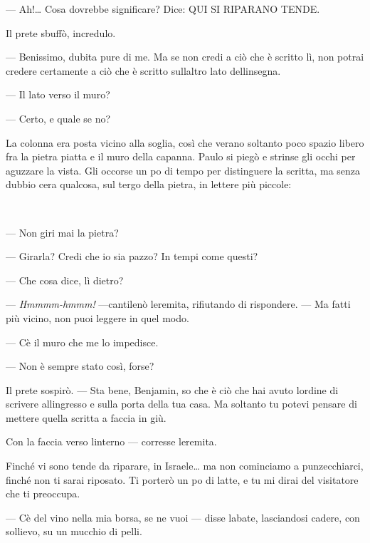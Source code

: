 --- Ah!\ldots{} Cosa dovrebbe significare? Dice: QUI SI RIPARANO TENDE.

Il prete sbuffò, incredulo.

--- Benissimo, dubita pure di me. Ma se non credi a ciò che è scritto
lì, non potrai credere certamente a ciò che è scritto
sull\textquotesingle altro lato dell\textquotesingle insegna.

--- Il lato verso il muro?

--- Certo, e quale se no?

La colonna era posta vicino alla soglia, così che
v\textquotesingle erano soltanto poco spazio libero fra la pietra piatta
e il muro della capanna. Paulo si piegò e strinse gli occhi per aguzzare
la vista. Gli occorse un po\textquotesingle{} di tempo per distinguere
la scritta, ma senza dubbio c\textquotesingle era qualcosa, sul tergo
della pietra, in lettere più piccole:

\begin{center}
	{\Huge{}}
\end{center}

~

--- Non giri mai la pietra?

--- Girarla? Credi che io sia pazzo? In tempi come questi?

--- Che cosa dice, lì dietro?

--- \emph{Hmmmm-hmmm!} ---cantilenò l\textquotesingle eremita,
rifiutando di rispondere. --- Ma fatti più vicino, non puoi leggere in
quel modo.

--- C\textquotesingle è il muro che me lo impedisce.

--- Non è sempre stato così, forse?

Il prete sospirò. --- Sta bene, Benjamin, so che è ciò che hai avuto
l\textquotesingle ordine di scrivere all\textquotesingle ingresso e
sulla porta della tua casa. Ma soltanto tu potevi pensare di mettere
quella scritta a faccia in giù.

Con la faccia verso l\textquotesingle interno --- corresse
l\textquotesingle eremita.

Finché vi sono tende da riparare, in Israele\ldots{} ma non cominciamo a
punzecchiarci, finché non ti sarai riposato. Ti porterò un
po\textquotesingle{} di latte, e tu mi dirai del visitatore che ti
preoccupa.

--- C\textquotesingle è del vino nella mia borsa, se ne vuoi --- disse
l\textquotesingle abate, lasciandosi cadere, con sollievo, su un mucchio
di pelli.

